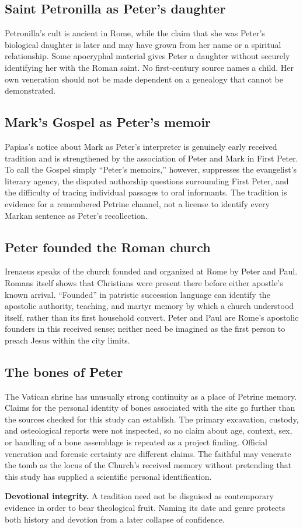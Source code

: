 \subsection{Saint Petronilla as Peter's daughter}

Petronilla's cult is ancient in Rome, while the claim that she was Peter's
biological daughter is later and may have grown from her name or a spiritual
relationship. Some apocryphal material gives Peter a daughter without
securely identifying her with the Roman saint. No first-century source names
a child. Her own veneration should not be made dependent on a genealogy that
cannot be demonstrated.

\subsection{Mark's Gospel as Peter's memoir}

Papias's notice about Mark as Peter's interpreter is genuinely early received
tradition and is strengthened by the association of Peter and Mark in First
Peter. To call the Gospel simply ``Peter's memoirs,'' however, suppresses the
evangelist's literary agency, the disputed authorship questions surrounding
First Peter, and the difficulty of tracing individual passages to oral
informants. The tradition is evidence for a remembered Petrine channel, not a
license to identify every Markan sentence as Peter's recollection.

\subsection{Peter founded the Roman church}

Irenaeus speaks of the church founded and organized at Rome by Peter and Paul.
Romans itself shows that Christians were present there before either apostle's
known arrival. ``Founded'' in patristic succession language can identify the
apostolic authority, teaching, and martyr memory by which a church understood
itself, rather than its first household convert. Peter and Paul are Rome's
apostolic founders in this received sense; neither need be imagined as the
first person to preach Jesus within the city limits.

\subsection{The bones of Peter}

The Vatican shrine has unusually strong continuity as a place of Petrine
memory. Claims for the personal identity of bones associated with the site go
further than the sources checked for this study can establish. The primary
excavation, custody, and osteological reports were not inspected, so no claim
about age, context, sex, or handling of a bone assemblage is repeated as a
project finding. Official veneration and forensic certainty are different
claims. The faithful may venerate the tomb as the locus of the Church's
received memory without pretending that this study has supplied a scientific
personal identification.

\begin{studyframe}
\textbf{Devotional integrity.} A tradition need not be disguised as
contemporary evidence in order to bear theological fruit. Naming its date and
genre protects both history and devotion from a later collapse of confidence.
\end{studyframe}
